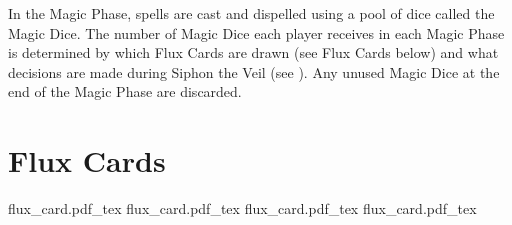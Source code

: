 In the Magic Phase, spells are cast and dispelled using a pool of dice called the Magic Dice. The number of Magic Dice each player receives in each Magic Phase is determined by which Flux Cards are drawn (see Flux Cards below) and what decisions are made during Siphon the Veil (see ).
Any unused Magic Dice at the end of the Magic Phase are discarded.

\section{Flux Cards}
\label{flux_cards}

\begin{figure*}[!t]
	\centering
	\def\fluxcardwidth{0.23\textwidth}
	\def\fluxcardgap{-0.01\textwidth}
	
	\def\FluxCardTitle{\Largefontsize\textbf{Flux Card 1}}
	\def\FluxCardDice{%
	\textbf{4 Magic Dice}\par
	(both players)}
	\def\FluxCardVeil{\textbf{3 Veil Tokens}\par
	(Active Player)}
	\def\FluxCardMiscast{\normalfontsize All Miscasts this phase gain a \textbf{+1} Miscast Modifier}
	\def\svgwidth{\fluxcardwidth}
	{flux_card.pdf_tex}
	\hspace{\fluxcardgap}
	\def\FluxCardTitle{\Largefontsize\textbf{Flux Card 2}}
	\def\FluxCardDice{%
	\textbf{5 Magic Dice}\par
	(both players)}
	\def\FluxCardVeil{\textbf{2 Veil Tokens}\par
	(Active Player)}
	\def\FluxCardMiscast{}
	\def\svgwidth{\fluxcardwidth}
	{flux_card.pdf_tex}
	\hspace{\fluxcardgap}
	\def\FluxCardTitle{\Largefontsize\textbf{Flux Card 3}}
	\def\FluxCardDice{%
	\textbf{5 Magic Dice}\par
	(both players)}
	\def\FluxCardVeil{\textbf{5 Veil Tokens}\par
	(Active Player)}
	\def\FluxCardMiscast{}
	\def\svgwidth{\fluxcardwidth}
	{flux_card.pdf_tex}
	\hspace{\fluxcardgap}
	\def\FluxCardTitle{\Largefontsize\textbf{Flux Card 4}}
	\def\FluxCardDice{%
	\textbf{5 Magic Dice}\par
	(both players)}
	\def\FluxCardVeil{\textbf{7 Veil Tokens}\par
	(Active Player)}
	\def\FluxCardMiscast{}
	\def\svgwidth{\fluxcardwidth}
	{flux_card.pdf_tex}
	

\end{figure*}
